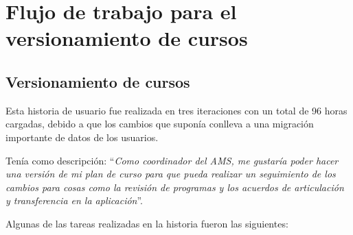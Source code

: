 \section{Flujo de trabajo para el versionamiento de cursos}
\begin{table}[H]
\centering
\caption{Historias de usuario para el flujo de trabajo para el versionamiento de cursos}
\label{epic:6}
\end{table}


\subsection{Versionamiento de cursos}
Esta historia de usuario fue realizada en tres iteraciones con un total de 96 horas cargadas, debido a que los cambios que suponía conlleva a una migración importante de datos de los usuarios.

Tenía como descripción: \enquote{\textit{Como coordinador del AMS, me gustaría poder hacer una versión de mi plan de curso para que pueda realizar un seguimiento de los cambios para cosas como la revisión de programas y los acuerdos de articulación y transferencia en la aplicación}}.

Algunas de las tareas realizadas en la historia fueron las siguientes:

